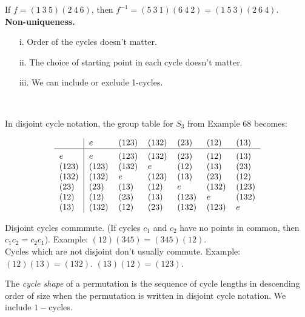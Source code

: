  If $f = (1~3~5)(2~4~6)$, then $f^{-1} = (5~3~1)(6~4~2) = (1~5~3)(2~6~4)$.\\
  
 \noindent \textbf{Non-uniqueness.} \begin{enumerate}
 \item[i.] Order of the cycles doesn't matter.	
 \item[ii.] The choice of starting point in each cycle doesn't matter.
 \item[iii.] We can include or exclude 1-cycles.
 \end{enumerate}~\\
 
\begin{example} 
 In disjoint cycle notation, the group table for $S_3$ from Example 68 becomes:


 \[
    \begin{tabular}{>{$}l<{$}|*{6}{>{$}l<{$}}}
    ~  & e   & (123)   & (132) & (23) & (12) & (13)  \\
    \hline\vrule height 12pt width 0pt
    e  & e   & (123)   & (132) & (23) & (12) & (13) \\
    (123)   & (123) & (132) & e & (12) & (13)& (23)\\
    (132) & (132) & e & (123) & (13) & (23) & (12) \\
    (23) & (23) & (13) & (12) & e & (132) & (123)\\
    (12) & (12) &  (23) & (13) & (123) & e & (132)\\
    (13) & (132) & (12) & (23) & (132)& (123) & e
    \end{tabular} 
\]
\end{example}
\vspace*{10pt}

\begin{remark} Disjoint cycles commmute. (If cycles $c_1$ and $c_2$ have no points in common, then $c_1c_2 = c_2c_1$). Example: $(12)(345) = (345)(12)$.\\

 Cycles which are not disjoint don't usually commute. Example: $(12)(13) = (132)$. $(13)(12) = (123)$.
 \end{remark}\vspace*{10pt}
 

\begin{definition} The \emph{cycle shape} of a permutation is the sequence of cycle lengths in descending order of size when the permutation is written in disjoint cycle notation. We include $1-$cycles.	
\end{definition}\vspace*{10pt}

